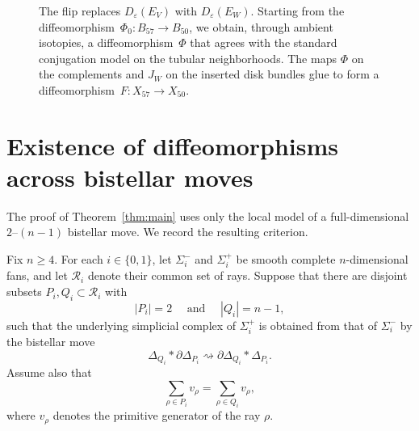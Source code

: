 \documentclass[10pt,a4paper]{amsart}
\numberwithin{equation}{section}
\newcommand{\cR}{\mathcal R}
\newcommand{\wideand}{ \quad \text{ and } \quad }
\DeclareMathOperator{\Int}{Int}
\begin{document}
\begin{figure}[t]

    \caption{
        The flip replaces $D_\varepsilon(E_V)$ with $D_\varepsilon(E_W)$.
        Starting from the diffeomorphism~$\Phi_0\colon B_{57}\to B_{50}$, we obtain, through ambient isotopies, a diffeomorphism~$\Phi$ that agrees with the standard conjugation model on the tubular neighborhoods.
        The maps $\Phi$ on the complements and $J_W$ on the inserted disk bundles glue to form a diffeomorphism~$F\colon X_{57}\to X_{50}$.
    }
    \label{fig:flip-surgery}
\end{figure}


\section{Existence of diffeomorphisms across bistellar moves}

The proof of Theorem~\ref{thm:main} uses only the local model of a full-dimensional $2$--$(n-1)$ bistellar move. 
We record the resulting criterion.

Fix $n\ge 4$. 
For each $i\in\{0,1\}$, let $\Sigma_i^-$ and $\Sigma_i^+$ be smooth complete $n$-dimensional fans, and let $\cR_i$ denote their common set of rays.
Suppose that there are disjoint subsets $P_i,Q_i\subset\cR_i$ with 
$$
    |P_i|=2 \wideand |Q_i|=n-1,
$$
such that the underlying simplicial complex of $\Sigma_i^+$ is obtained from that of $\Sigma_i^-$ by the bistellar move
$$
    \Delta_{Q_i}*\partial\Delta_{P_i} \rightsquigarrow \partial\Delta_{Q_i}*\Delta_{P_i}.
$$
Assume also that
$$
    \sum_{\rho\in P_i}v_\rho =\sum_{\rho\in Q_i}v_\rho,
$$
where $v_\rho$ denotes the primitive generator of the ray $\rho$.
\end{document}

